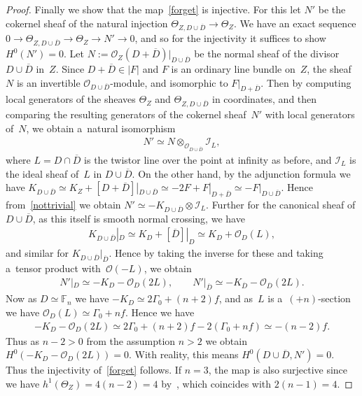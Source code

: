 \begin{proof}
Finally we show that the map~\eqref{forget} is injective.
For this let $N'$ be the cokernel sheaf of the natural injection $\Theta_{Z,D\cup\overline D}\to \Theta_Z$.
We have an exact sequence $0\to \Theta_{Z, D\cup \overline D}\to \Theta_Z\to N'\to 0$, and so for the injectivity it
suf\/f\/ices to show $H^0(N') = 0$.
Let $N:=\mathscr O_Z(D+\overline D)|_{D\cup\overline D}$ be the normal sheaf of the divisor $D\cup \overline D$ in~$Z$.
Since $D+\overline D\in |F|$ and $F$ is an ordinary line bundle on~$Z$, the sheaf~$N$ is an invertible $\mathscr
O_{D\cup\overline D}$-module, and isomorphic to $F|_{D+\overline D}$.
Then by computing local generators of the sheaves $\Theta_{Z}$ and $\Theta_{Z,D\cup\overline D}$ in coordinates, and
then comparing the resulting generators of the cokernel sheaf~$N'$ with local generators of~$N$, we obtain a~natural
isomorphism
\begin{gather}
\label{nottrivial}
N'\simeq N\otimes_{\mathscr O_{D\cup\overline D}}\mathscr I_{L},
\end{gather}
where $L=D\cap \overline D$ is the twistor line over the point at inf\/inity as before, and $\mathscr I_L$ is the ideal
sheaf of~$L$ in $D\cup \overline D$.
On the other hand, by the adjunction formula we have $K_{D\cup\overline D} \simeq K_Z + [D+\overline D]|_{D\cup\overline
D}\simeq -2F + F|_{D+\overline D}\simeq -F|_{D\cup\overline D}$.
Hence from~\eqref{nottrivial} we obtain $N'\simeq -K_{D\cup\overline D}\otimes \mathscr I_L$.
Further for the canonical sheaf of $D\cup\overline D$, as this itself is smooth normal crossing, we have
\begin{gather*}%
K_{D\cup\overline D}|_D \simeq K_D +[\overline D]|_D \simeq K_D+\mathscr O_D(L),
\end{gather*}
and similar for $K_{D\cup\overline D}|_{\overline D}$.
Hence by taking the inverse for these and taking a~tensor product with~$\mathscr O(-L)$, we obtain
\begin{gather}
\label{N''}
N'|_D\simeq -K_D-\mathscr O_D(2L),
\qquad
N'|_{\overline D}\simeq -K_{\overline D}-\mathscr O_{\overline D}(2L).
\end{gather}
Now as $D\simeq\mathbb{F}_n$ we have $-K_D\simeq 2\Gamma_0+(n+2)f$, and as~$L$ is a~$(+n)$-section
we have $\mathscr O_D(L)\simeq \Gamma_0+nf$.
Hence we have
\begin{gather}
\label{N'}
-K_D-\mathscr O_D(2L) \simeq 2\Gamma_0+(n+2)f -2(\Gamma_0 + n f) \simeq -(n-2)f.
\end{gather}
Thus as $n-2>0$ from the assumption $n>2$ we obtain $H^0(-K_D-\mathscr O_D(2L))=0$.
With reality, this means $H^0(D\cup \overline D,N')=0$.
Thus the injectivity of~\eqref{forget} follows.
If $n=3$, the map is also surjective since we have $h^1(\Theta_Z) = 4(n-2) = 4$ by~\cite[Proposition~2.1]{HonCMP2}, which
coincides with $2(n-1) = 4$.
\end{proof}

